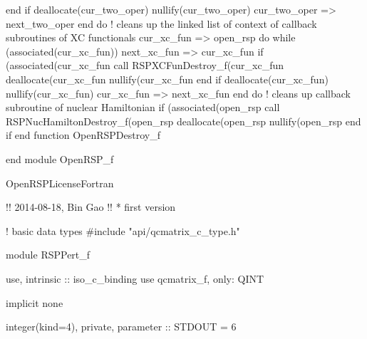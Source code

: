             end if
            deallocate(cur_two_oper)
            nullify(cur_two_oper)
            cur_two_oper => next_two_oper
        end do
        ! cleans up the linked list of context of callback subroutines of XC functionals
        cur_xc_fun => open_rsp%
        do while (associated(cur_xc_fun))
            next_xc_fun => cur_xc_fun%
            if (associated(cur_xc_fun%
                call RSPXCFunDestroy_f(cur_xc_fun%
                deallocate(cur_xc_fun%
                nullify(cur_xc_fun%
            end if
            deallocate(cur_xc_fun)
            nullify(cur_xc_fun)
            cur_xc_fun => next_xc_fun
        end do
        ! cleans up callback subroutine of nuclear Hamiltonian
        if (associated(open_rsp%
            call RSPNucHamiltonDestroy_f(open_rsp%
            deallocate(open_rsp%
            nullify(open_rsp%
        end if
    end function OpenRSPDestroy_f

end module OpenRSP_f

\nwendcode{}\endmoddef
\LA{}OpenRSPLicenseFortran~{\nwtagstyle{}}\RA{}

!!  2014-08-18, Bin Gao
!!  * first version

! basic data types
#include "api/qcmatrix_c_type.h"

module RSPPert_f

    use, intrinsic :: iso_c_binding
    use qcmatrix_f, only: QINT

    implicit none

    integer(kind=4), private, parameter :: STDOUT = 6

